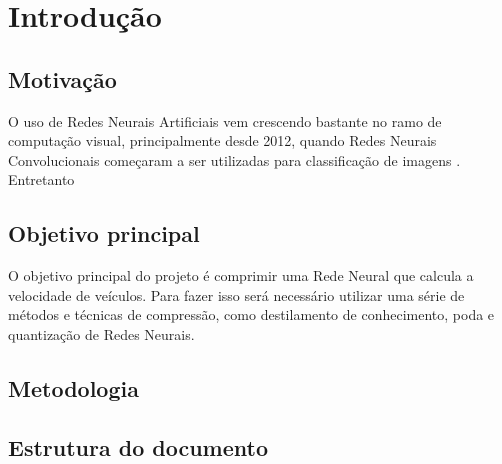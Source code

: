 \chapter{Introdução}

\section{Motivação}
O uso de Redes Neurais Artificiais vem crescendo bastante no ramo de computação visual, principalmente
desde 2012, quando Redes Neurais Convolucionais começaram a ser utilizadas para classificação de imagens
\cite{alexnet}. Entretanto


\section{Objetivo principal}
O objetivo principal do projeto é comprimir uma Rede Neural que calcula a velocidade de veículos. Para fazer isso será
necessário utilizar uma série de métodos e técnicas de compressão, como destilamento de conhecimento, poda e quantização de Redes Neurais.

\section{Metodologia}

\section{Estrutura do documento}
